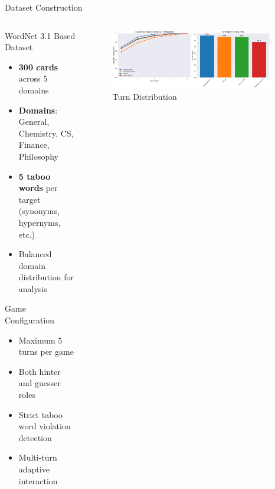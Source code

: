 \documentclass[aspectratio=169]{beamer}
\begin{document}
\begin{frame}{Dataset Construction}
\begin{columns}
\begin{column}{0.6\textwidth}
\begin{block}{WordNet 3.1 Based Dataset}
\begin{itemize}
    \item \textbf{300 cards} across 5 domains
    \item \textbf{Domains}: General, Chemistry, CS, Finance, Philosophy
    \item \textbf{5 taboo words} per target (synonyms, hypernyms, etc.)
    \item Balanced domain distribution for analysis
\end{itemize}
\end{block}

\begin{block}{Game Configuration}
\begin{itemize}
    \item Maximum 5 turns per game
    \item Both hinter and guesser roles
    \item Strict taboo word violation detection
    \item Multi-turn adaptive interaction
\end{itemize}
\end{block}
\end{column}

\begin{column}{0.4\textwidth}
\begin{figure}[h]
\centering
\includegraphics[width=0.95\textwidth]{comprehensive_figures/figure2_efficiency.png}
\caption{Turn Distribution}
\end{figure}
\end{column}
\end{columns}
\end{frame}
\end{document}
